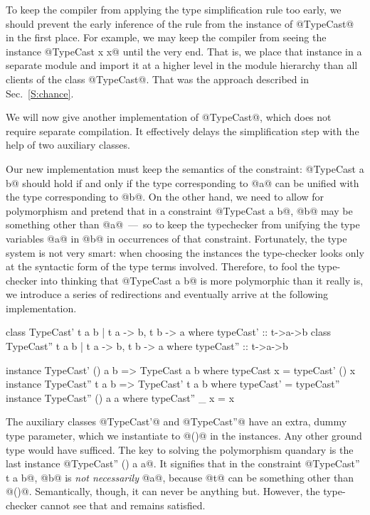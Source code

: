 \documentclass[nocopyrightspace,preprint]{sigplan-proc}
\newcommand{\hwVsTr}[2]{#2}
\begin{document}
To keep the compiler from applying the type simplification rule too
early, we should prevent the early inference of the rule from the
instance of @TypeCast@ in the first place. For example, we may keep
the compiler from seeing the instance @TypeCast x x@ until the very
end. That is, we place that instance in a separate module and import
it at a higher level in the module hierarchy than all clients of the
class @TypeCast@. That was the approach described in
Sec.~\ref{S:chance}.

We will now give another implementation of @TypeCast@, which does not
require separate compilation. It effectively delays the simplification
step with the help of two auxiliary classes.

Our new implementation must keep the semantics of the constraint:
@TypeCast a b@ should hold if and only if the type corresponding to
@a@ can be unified with the type corresponding to @b@. On the other
hand, we need to allow for polymorphism and pretend that in a
constraint @TypeCast a b@, @b@ may be something other than @a@~---~so
to keep the typechecker from unifying the type variables @a@ in @b@ in
occurrences of that constraint. Fortunately, the type system is not
very smart: when choosing the instances the type-checker looks only at
the syntactic form of the type terms involved. Therefore, to fool the
type-checker into thinking that @TypeCast a b@ is more polymorphic
than it really is, we introduce a series of redirections and
eventually arrive at the following implementation.

\hwVsTr{}{\newpage}


\begin{code}
 class TypeCast'  t a b | t a -> b, t b -> a
  where typeCast'  :: t->a->b
 class TypeCast'' t a b | t a -> b, t b -> a
  where typeCast'' :: t->a->b
\end{code}

\begin{code}
 instance TypeCast'  () a b => TypeCast a b
    where typeCast x = typeCast' () x
 instance TypeCast'' t a b => TypeCast' t a b
    where typeCast' = typeCast''
 instance TypeCast'' () a a
    where typeCast'' _ x  = x
\end{code}

The auxiliary classes @TypeCast'@ and @TypeCast''@ have an extra,
dummy type parameter, which we instantiate to @()@ in the instances.
Any other ground type would have sufficed. The key to solving the
polymorphism quandary is the last instance @TypeCast'' () a a@. It
signifies that in the constraint @TypeCast'' t a b@, @b@ is \emph{not
necessarily} @a@, because @t@ can be something other than
@()@. Semantically, though, it can never be anything but. However, the
type-checker cannot see that and remains satisfied. 
\end{document}

